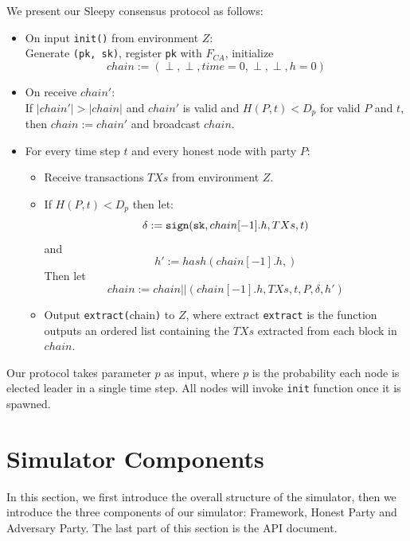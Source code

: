 \documentclass[
10pt, %
a4paper, %
oneside, %
headinclude,footinclude, %
BCOR5mm, %
]{scrartcl}
\begin{document}
We present our Sleepy consensus protocol as follows:
\begin{itemize}
    \item On input \verb|init()| from environment $Z$: \\
        Generate \verb|(pk, sk)|, register \verb|pk| with $F_{CA}$, initialize
        \[chain := (\perp,\perp,time=0,\perp,\perp,h=0)\]
    \item On receive $chain'$: \\
        If $|chain'| > |chain|$ and $chain'$ is valid and $H(P,t) < D_p$ for valid $P$ and $t$, then $chain := chain'$ and broadcast $chain$.
    \item For every time step $t$ and every honest node with party $P$:
    \begin{itemize}
        \item Receive transactions $TXs$ from environment $Z$.
        \item If $H(P, t) < D_p$ then let:
        \[
            \delta := \verb|sign|(\verb|sk|, chain[-1].h, TXs, t)
        \]
        and
        \[
            h' := hash(chain[-1].h,)
        \]
        Then let
        \[
            chain := chain || (chain[-1].h, TXs, t, P, \delta, h')
        \]
        \item Output \verb|extract(|chain\verb|)| to $Z$, where extract \verb|extract| is the function outputs an ordered list containing the $TXs$ extracted from each block in $chain$.
    \end{itemize}
\end{itemize}
Our protocol takes parameter $p$ as input, where $p$ is the probability each node is elected leader in a single time step. All nodes will invoke \verb|init| function once it is spawned.
\section{Simulator Components}
In this section, we first introduce the overall structure of the simulator, then we introduce the three components of our simulator: Framework, Honest Party and Adversary Party. The last part of this section is the API document.
\end{document}
